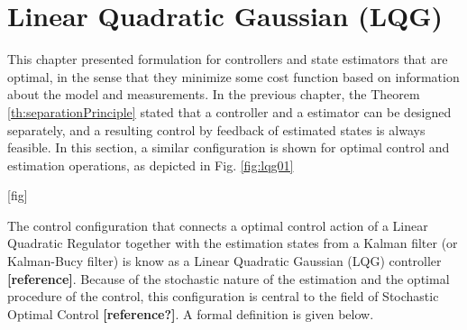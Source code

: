 \documentclass[a4paper,11pt]{book}
\numberwithin{figure}{chapter}
\numberwithin{equation}{chapter}
\numberwithin{table}{chapter}
\theoremstyle{definition}
\begin{document}
\section{Linear Quadratic Gaussian (LQG)}

This chapter presented formulation for controllers and state estimators that are optimal, in the sense that they minimize some cost function based on information about the model and measurements. In the previous chapter, the Theorem \ref{th:separationPrinciple} stated that a controller and a estimator can be designed separately, and a resulting control by feedback of estimated states is always feasible. In this section, a similar configuration is shown for optimal control and estimation operations, as depicted in Fig. \ref{fig:lqg01}

[fig]

The control configuration that connects a optimal control action of a Linear Quadratic Regulator together with the estimation states from a Kalman filter (or Kalman-Bucy filter) is know as a Linear Quadratic Gaussian (LQG) controller \textbf{[reference]}. Because of the stochastic nature of the estimation and the optimal procedure of the control, this configuration is central to the field of Stochastic Optimal Control \textbf{[reference?]}. A formal definition is given below.
\end{document}
